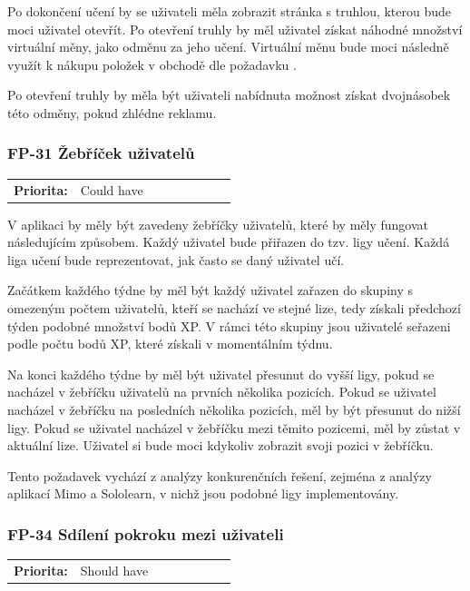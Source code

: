Po dokončení učení by se uživateli měla zobrazit stránka s truhlou, kterou bude moci uživatel otevřít. Po otevření truhly by měl uživatel získat náhodné množství virtuální měny, jako odměnu za jeho učení. Virtuální měnu bude moci následně využít k nákupu položek v obchodě dle požadavku .

Po otevření truhly by měla být uživateli nabídnuta možnost získat dvojnásobek této odměny, pokud zhlédne reklamu.

\subsubsection{FP-31 Žebříček uživatelů}\label{sec:fp-leaderboard}

\begin{tabular}{lp{0.7\linewidth}}
    \textbf{Priorita:} & Could have \\
\end{tabular}

V aplikaci by měly být zavedeny žebříčky uživatelů, které by měly fungovat následujícím způsobem. Každý uživatel bude přiřazen do tzv. ligy učení. Každá liga učení bude reprezentovat, jak často se daný uživatel učí.

Začátkem každého týdne by měl být každý uživatel zařazen do skupiny s omezeným počtem uživatelů, kteří se nachází ve stejné lize, tedy získali předchozí týden podobné množství bodů XP. V rámci této skupiny jsou uživatelé seřazeni podle počtu bodů XP, které získali v momentálním týdnu.

Na konci každého týdne by měl být uživatel přesunut do vyšší ligy, pokud se nacházel v žebříčku uživatelů na prvních několika pozicích. Pokud se uživatel nacházel v žebříčku na posledních několika pozicích, měl by být přesunut do nižší ligy. Pokud se uživatel nacházel v žebříčku mezi těmito pozicemi, měl by zůstat v aktuální lize. Uživatel si bude moci kdykoliv zobrazit svoji pozici v žebříčku.

Tento požadavek vychází z analýzy konkurenčních řešení, zejména z analýzy aplikací Mimo a Sololearn, v nichž jsou podobné ligy implementovány.

\subsubsection{FP-34 Sdílení pokroku mezi uživateli}\label{sec:fp-progress-sharing}

\begin{tabular}{lp{0.7\linewidth}}
    \textbf{Priorita:} & Should have \\
\end{tabular}

